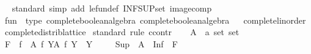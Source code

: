 \begin{isabellebody}
\isanewline
{}\isamarkupfalse%
%
\isadelimproof
\ %
\endisadelimproof
%
\isatagproof
{}\isamarkupfalse%
\ standard\ {\isacharparenleft}{\kern0pt}simp\ add{\isacharcolon}{\kern0pt}\ le{\isacharunderscore}{\kern0pt}fun{\isacharunderscore}{\kern0pt}def\ INF{\isacharunderscore}{\kern0pt}SUP{\isacharunderscore}{\kern0pt}set\ image{\isacharunderscore}{\kern0pt}comp{\isacharparenright}{\kern0pt}%
\endisatagproof
{\isafoldproof}%
%
\isadelimproof
%
\endisadelimproof
\isanewline
{}\isamarkupfalse%
\isanewline
\isanewline
{}\isamarkupfalse%
\ {\isachardoublequoteopen}fun{\isachardoublequoteclose}\ {\isacharcolon}{\kern0pt}{\isacharcolon}{\kern0pt}\ {\isacharparenleft}{\kern0pt}type{\isacharcomma}{\kern0pt}\ complete{\isacharunderscore}{\kern0pt}boolean{\isacharunderscore}{\kern0pt}algebra{\isacharparenright}{\kern0pt}\ complete{\isacharunderscore}{\kern0pt}boolean{\isacharunderscore}{\kern0pt}algebra%
\isadelimproof
\ %
\endisadelimproof
%
\isatagproof
\isacommand{{\isachardot}{\kern0pt}{\isachardot}{\kern0pt}}\isamarkupfalse%
%
\endisatagproof
{\isafoldproof}%
%
\isadelimproof
%
\endisadelimproof
\isanewline
\isanewline
{}\isamarkupfalse%
\ complete{\isacharunderscore}{\kern0pt}linorder\isanewline
{}\isanewline
\isanewline
{}\isamarkupfalse%
\ complete{\isacharunderscore}{\kern0pt}distrib{\isacharunderscore}{\kern0pt}lattice\isanewline
%
\isadelimproof
%
\endisadelimproof
%
\isatagproof
{}\isamarkupfalse%
\ {\isacharparenleft}{\kern0pt}standard{\isacharcomma}{\kern0pt}\ rule\ ccontr{\isacharparenright}{\kern0pt}\isanewline
\ \ \isamarkupfalse%
\ A\ {\isacharcolon}{\kern0pt}{\isacharcolon}{\kern0pt}\ {\isachardoublequoteopen}{\isacharprime}{\kern0pt}a\ set\ set{\isachardoublequoteclose}\isanewline
\ \ \isamarkupfalse%
\ {\isacharquery}{\kern0pt}F\ {\isacharequal}{\kern0pt}\ {\isachardoublequoteopen}{\isacharbraceleft}{\kern0pt}f\ {\isacharbackquote}{\kern0pt}\ A\ {\isacharbar}{\kern0pt}f{\isachardot}{\kern0pt}\ {\isasymforall}Y{\isasymin}A{\isachardot}{\kern0pt}\ f\ Y\ {\isasymin}\ Y{\isacharbraceright}{\kern0pt}{\isachardoublequoteclose}\isanewline
\ \ \isamarkupfalse%
\ {\isachardoublequoteopen}{\isasymnot}\ {\isasymSqinter}{\isacharparenleft}{\kern0pt}Sup\ {\isacharbackquote}{\kern0pt}\ A{\isacharparenright}{\kern0pt}\ {\isasymle}\ {\isasymSqunion}{\isacharparenleft}{\kern0pt}Inf\ {\isacharbackquote}{\kern0pt}\ {\isacharquery}{\kern0pt}F{\isacharparenright}{\kern0pt}{\isachardoublequoteclose}\isanewline

\end{isabellebody}
